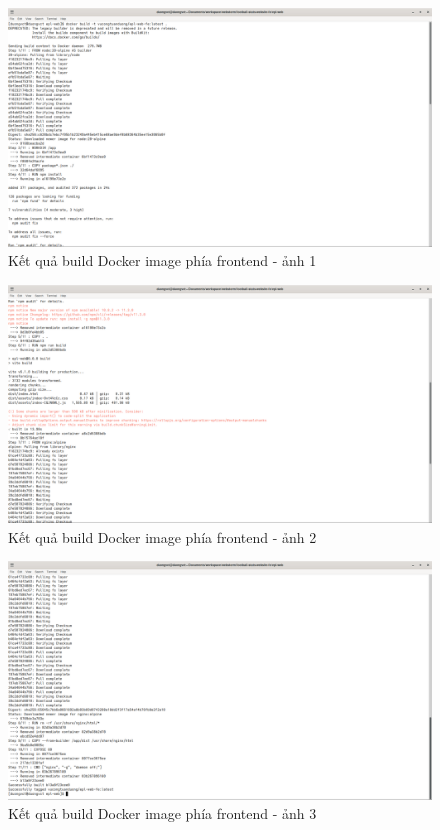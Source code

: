 \documentclass[../BTL.tex]{subfiles}
\begin{document}
\begin{figure}
    \centering
    \includegraphics[width=1\linewidth]{Hinhve/docker-build-fe1.png}
    \caption{Kết quả build Docker image phía frontend - ảnh 1}
    \label{fig:docker-build-fe1}
\end{figure}
\begin{figure}
    \centering
    \includegraphics[width=1\linewidth]{Hinhve/docker-build-fe2.png}
    \caption{Kết quả build Docker image phía frontend - ảnh 2}
    \label{fig:docker-build-fe2}
\end{figure}
\begin{figure}
    \centering
    \includegraphics[width=1\linewidth]{Hinhve/docker-build-fe3.png}
    \caption{Kết quả build Docker image phía frontend - ảnh 3}
    \label{fig:docker-build-fe3}
\end{figure}
\end{document}
